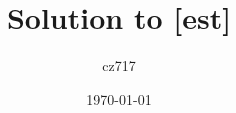 \documentclass[a4paper]{report}
\begin{document}
  \title{Solution to [est]}
  \author{cz717}
  \date{\today}
  \maketitle




  
  
\end{document}
